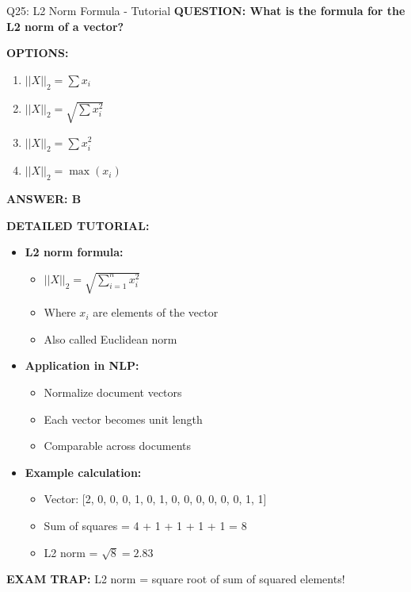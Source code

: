 \documentclass[8pt]{beamer}
\begin{document}
	\begin{frame}{Q25: L2 Norm Formula - Tutorial}
		\fontsize{6.5}{7.5}\selectfont
		\textbf{QUESTION: What is the formula for the L2 norm of a vector?}
		
		\vspace{0.1cm}
		\textbf{OPTIONS:}
		\begin{enumerate}
			\item $||X||_2 = \sum x_i$
			\item $||X||_2 = \sqrt{\sum x_i^2}$
			\item $||X||_2 = \sum x_i^2$
			\item $||X||_2 = \max(x_i)$
		\end{enumerate}
		
		\vspace{0.1cm}
		\textcolor{myblue}{\textbf{ANSWER: B}}
		
		\vspace{0.1cm}
		\textbf{DETAILED TUTORIAL:}
		\begin{itemize}
			\item \textbf{L2 norm formula:}
			\begin{itemize}
				\item $||X||_2 = \sqrt{\sum_{i=1}^n x_i^2}$
				\item Where $x_i$ are elements of the vector
				\item Also called Euclidean norm
			\end{itemize}
			\item \textbf{Application in NLP:}
			\begin{itemize}
				\item Normalize document vectors
				\item Each vector becomes unit length
				\item Comparable across documents
			\end{itemize}
			\item \textbf{Example calculation:}
			\begin{itemize}
				\item Vector: [2, 0, 0, 0, 1, 0, 1, 0, 0, 0, 0, 0, 0, 1, 1]
				\item Sum of squares = 4 + 1 + 1 + 1 + 1 = 8
				\item L2 norm = $\sqrt{8} = 2.83$
			\end{itemize}
		\end{itemize}
		
		\textcolor{myred}{\textbf{EXAM TRAP:}} L2 norm = \textcolor{myblue}{square root of sum of squared elements}!
	\end{frame}
	
\end{document}
